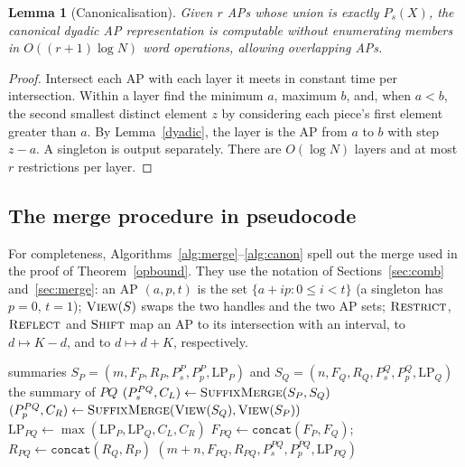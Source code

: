 ﻿\documentclass[11pt]{article}
\theoremstyle{plain}
\newtheorem{lemma}[theorem]{Lemma}
\theoremstyle{remark}
\begin{document}
\begin{lemma}[Canonicalisation]\label{canon}
Given $r$ APs whose union is exactly $P_s(X)$, the canonical dyadic AP representation is computable without enumerating members in $O((r+1)\log N)$ word operations, allowing overlapping APs.
\end{lemma}
\begin{proof}
Intersect each AP with each layer it meets in constant time per intersection. Within a layer find the minimum $a$, maximum $b$, and, when $a<b$, the second smallest distinct element $z$ by considering each piece's first element greater than $a$. By Lemma~\ref{dyadic}, the layer is the AP from $a$ to $b$ with step $z-a$. A singleton is output separately. There are $O(\log N)$ layers and at most $r$ restrictions per layer.
\end{proof}

\subsection{The merge procedure in pseudocode}\label{sec:pseudo}
For completeness, Algorithms~\ref{alg:merge}--\ref{alg:canon} spell out the merge used in
the proof of Theorem~\ref{opbound}. They use the notation of
Sections~\ref{sec:comb} and~\ref{sec:merge}: an AP $(a,p,t)$ is the set
$\{a+ip:0\le i<t\}$ (a singleton has $p=0$, $t=1$); $\textsc{View}(S)$ swaps the
two handles and the two AP sets; $\textsc{Restrict}$, $\textsc{Reflect}$ and
$\textsc{Shift}$ map an AP to its intersection with an interval, to
$d\mapsto K-d$, and to $d\mapsto d+K$, respectively.

\begin{algorithm}[H]
\caption{Merge two node summaries}
\label{alg:merge}
\begin{algorithmic}[1]
\Require summaries $S_P=(m,F_P,R_P,P_s^P,P_p^P,\mathrm{LP}_P)$ and
         $S_Q=(n,F_Q,R_Q,P_s^Q,P_p^Q,\mathrm{LP}_Q)$
\Ensure the summary of $PQ$
\State $(P_s^{PQ},C_L)\gets\textsc{SuffixMerge}(S_P,S_Q)$
\State $(P_p^{PQ},C_R)\gets\textsc{SuffixMerge}(\textsc{View}(S_Q),\textsc{View}(S_P))$
\State $\mathrm{LP}_{PQ}\gets\max(\mathrm{LP}_P,\mathrm{LP}_Q,C_L,C_R)$
\State $F_{PQ}\gets\texttt{concat}(F_P,F_Q)$;\quad
       $R_{PQ}\gets\texttt{concat}(R_Q,R_P)$
\State \Return $(m+n,F_{PQ},R_{PQ},P_s^{PQ},P_p^{PQ},\mathrm{LP}_{PQ})$
\end{algorithmic}
\end{algorithm}
\end{document}
